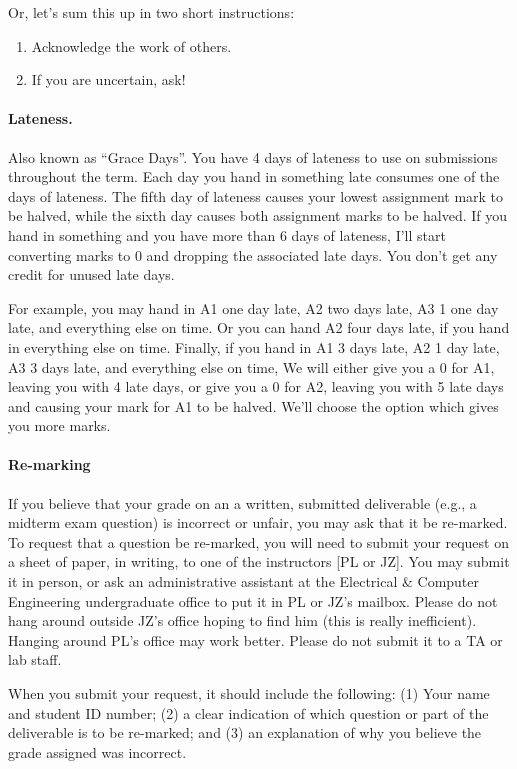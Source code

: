 \documentclass[letterpaper,10pt]{article}
\begin{document}
Or, let's sum this up in two short instructions:
\begin{enumerate}
	\item Acknowledge the work of others. 
	\item If you are uncertain, ask!
\end{enumerate}


\paragraph{Lateness.} Also known as ``Grace Days''. You have 4 days of lateness to use on 
submissions throughout the term. Each day you hand in something late
consumes one of the days of lateness. The fifth day of lateness causes
your lowest assignment mark to be halved, while the sixth day causes
both assignment marks to be halved. If you hand in something and you
have more than 6 days of lateness, I'll start converting marks to 0
and dropping the associated late days. You don't
get any credit for unused late days.

For example, you may hand in A1 one day late, A2 two days late, A3 1
one day late, and everything else on time.  Or you can hand A2 four
days late, if you hand in everything else on time. Finally, if you
hand in A1 3 days late, A2 1 day late, A3 3 days late, and
everything else on time, We will either give you a 0 for A1, leaving you
with 4 late days, or give you a 0 for A2, leaving you with 5 late days
and causing your mark for A1 to be halved. We'll choose the option
which gives you more marks.

\paragraph{Re-marking}
If you believe that your grade on an a written, submitted deliverable (e.g., a midterm exam question) is incorrect or unfair, you may ask that it be re-marked. To request that a question be re-marked, you will need to submit your request on a sheet of paper, in writing, to one of the instructors [PL or JZ]. You may submit it in person, or ask an administrative assistant at the Electrical \& Computer Engineering undergraduate office to put it in PL or JZ's mailbox. Please do not hang around outside JZ's office hoping to find him (this is really inefficient). Hanging around PL's office may work better. Please do not submit it to a TA or lab staff.

When you submit your request, it should include the following: (1) Your name and student ID number; (2) a clear indication of which question or part of the deliverable is to be re-marked; and (3) an explanation of why you believe the grade assigned was incorrect.
\end{document}
